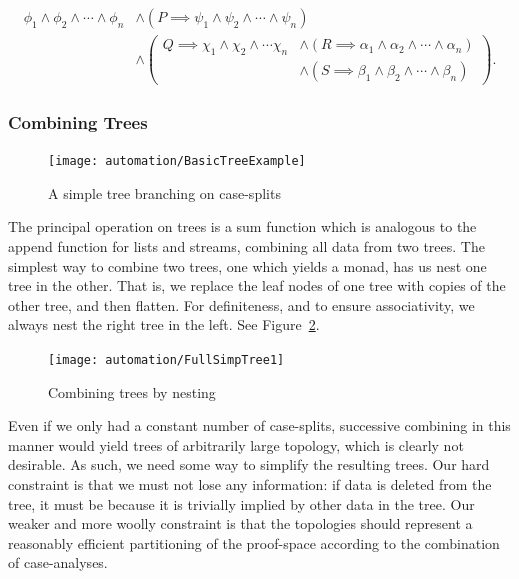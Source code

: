 \begin{equation}\label{eq:CaseAnalysisTreeFormula}
\begin{aligned}
\phi_1 \wedge \phi_2 \wedge \cdots \wedge \phi_n &\wedge (P \implies \psi_1 \wedge \psi_2 \wedge \cdots \wedge \psi_n)\\
&\wedge \left(\begin{aligned} Q \implies \chi_1 \wedge \chi_2 \wedge \cdots \chi_n &\wedge (R \implies \alpha_1 \wedge \alpha_2 \wedge \cdots \wedge \alpha_n)\\ &\wedge (S \implies \beta_1 \wedge \beta_2 \wedge \cdots \wedge \beta_n)\end{aligned}\right).
\end{aligned}
\end{equation}

\subsubsection{Combining Trees}\label{fig:CombiningTrees}
\begin{figure}
\centering\texttt{[image: automation/BasicTreeExample]}
\caption{A simple tree branching on case-splits}
\label{fig:BasicTreeExample}
\end{figure}

The principal operation on trees is a sum function which is analogous to the append function for lists and streams, combining all data from two trees. The simplest way to combine two trees, one which yields a monad, has us nest one tree in the other. That is, we replace the leaf nodes of one tree with copies of the other tree, and then flatten. For definiteness, and to ensure associativity, we always nest the right tree in the left. See Figure~\ref{fig:TreeNesting}.

\begin{figure}
\centering\texttt{[image: automation/FullSimpTree1]}
\caption{Combining trees by nesting}
\label{fig:TreeNesting}
\end{figure}

Even if we only had a constant number of case-splits, successive combining in this manner would yield trees of arbitrarily large topology, which is clearly not desirable. As such, we need some way to simplify the resulting trees. Our hard constraint is that we must not lose any information: if data is deleted from the tree, it must be because it is trivially implied by other data in the tree. Our weaker and more woolly constraint is that the topologies should represent a reasonably efficient partitioning of the proof-space according to the combination of case-analyses. 

